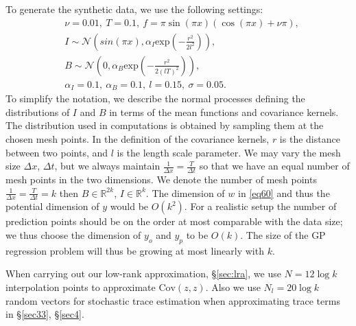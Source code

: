 \documentclass[article,ij4uq]{ij4uq}              %
\begin{document}
\par To generate the synthetic data, we use the following settings:
\begin{align}
    &\nu=0.01,\ T=0.1,\ f=\pi\sin{(\pi x)}(\cos{(\pi x)}+\nu \pi),\label{eq61}\\
    &I\sim\mathcal{N}(sin(\pi x),\alpha_{I}\mathrm{exp}(-\frac{r^{2}}{2l^{2}})),\label{eq62}\\ &B\sim\mathcal{N}(0,\alpha_{B}\mathrm{exp}(-\frac{r^{2}}{2(lT)^{2}})),\label{eq63}\\
    &\alpha_{I}=0.1,\ \alpha_{B}=0.1,\ l=0.15,\ \sigma=0.05.\label{eq:true_parameter}
\end{align}
To simplify the notation, we describe the normal processes defining the distributions of $I$ and $B$ in terms of the mean functions and covariance kernels. The distribution used in computations is obtained by sampling them at the chosen mesh points. In the definition of the covariance kernels, $r$ is the distance between two points, and $l$ is the length scale parameter. We may vary the mesh size $\Delta x$, $\Delta t$, but we always maintain $\frac{1}{\Delta x}=\frac{T}{\Delta t}$ so that we have an equal number of mesh points in the two dimensions. We denote the number of mesh points $\frac{1}{\Delta x}=\frac{T}{\Delta t}=k$ then $B\in\mathbb{R}^{2k}$, $I\in\mathbb{R}^{k}$. The dimension of $w$ in \eqref{eq60} and thus the potential dimension of $y$ would be $O(k^2)$. For a realistic setup the number of prediction points should be on the order at most comparable with the data size; we  thus choose the dimension of $y_o$ and $y_p$ to be $O(k)$. The size of the GP regression problem will thus be growing at most linearly with $k$.
 
  When carrying out our low-rank approximation, \S \ref{sec:lra}, we use $N=12\log{k}$ interpolation points to approximate $\mathrm{Cov}(z,z)$. Also we use $N_{l}=20\log{k}$ random vectors for stochastic trace estimation when approximating trace terms in \S \ref{sec33}, \S \ref{sec4}. 
\end{document}
